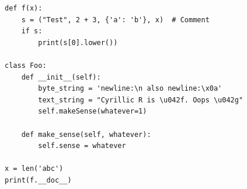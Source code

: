 \documentclass{modern}
\begin{document}
\begin{verbatim}
def f(x):
    s = ("Test", 2 + 3, {'a': 'b'}, x)  # Comment
    if s:
        print(s[0].lower())

class Foo:
    def __init__(self):
        byte_string = 'newline:\n also newline:\x0a'
        text_string = "Cyrillic R is \u042f. Oops \u042g"
        self.makeSense(whatever=1)
	
    def make_sense(self, whatever):
        self.sense = whatever

x = len('abc')
print(f.__doc__)
\end{verbatim}


\lipsum[4]
\end{document}
